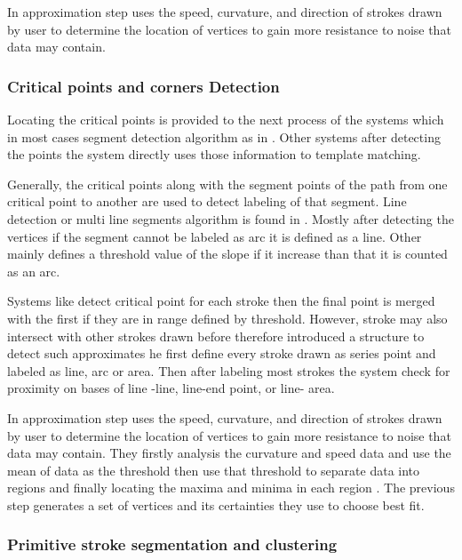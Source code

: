 In \cite {domainindependent17}    approximation step uses the speed, curvature, and direction of strokes drawn by user to determine the location of vertices to gain more resistance to noise that data may contain. 


\subsubsection{Critical points and corners Detection}
\label{sec:CriticalPointsAndCornersDetection}

Locating the critical points is provided to the next process of the systems which in most cases segment detection algorithm as in \cite{Simusketch51} . Other systems after detecting the points the system directly uses those information to template matching.

Generally, the critical points along with the segment points of the path from one critical point to another are used to detect labeling of that segment. 
Line detection or multi line segments algorithm is found in \cite{polygonfeedback31} . Mostly after detecting the vertices if the segment cannot be labeled as arc it is defined as a line. Other mainly defines a threshold value of the slope if it increase than that it is counted as an arc.

Systems like \cite{physicalmeaning6} detect critical point for each stroke then the final point is merged with the first if they are in range defined by threshold. However, stroke may also intersect with other strokes drawn before therefore \cite{physicalmeaning6}  introduced a structure to detect such approximates he first define every stroke drawn as series point and labeled as line, arc or area. Then after labeling most strokes the system check for proximity on bases of line -line, line-end point, or line- area. 


In   \cite {meanshift10,domainindependent17}   approximation step uses the speed, curvature, and direction of strokes drawn by user to determine the location of vertices to gain more resistance to noise that data may contain. They firstly analysis the curvature and speed data and use the mean of data as the threshold then use that threshold to separate data into regions and finally locating the maxima and minima in each region . The previous step generates a set of vertices and its certainties they use to choose best fit.

\subsubsection {Primitive stroke segmentation and clustering}
\label{sec:Primitivestrokesegmentationandclustering}

